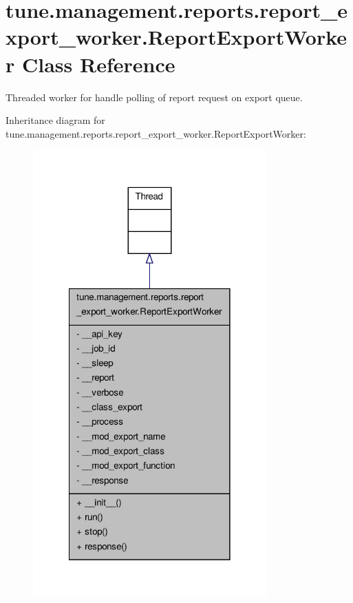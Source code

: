 \hypertarget{classtune_1_1management_1_1reports_1_1report__export__worker_1_1ReportExportWorker}{\section{tune.\-management.\-reports.\-report\-\_\-export\-\_\-worker.\-Report\-Export\-Worker Class Reference}
\label{classtune_1_1management_1_1reports_1_1report__export__worker_1_1ReportExportWorker}
}


Threaded worker for handle polling of report request on export queue.  




Inheritance diagram for tune.\-management.\-reports.\-report\-\_\-export\-\_\-worker.\-Report\-Export\-Worker\-:
\nopagebreak
\begin{figure}[H]
\begin{center}
\leavevmode
\includegraphics[width=254pt]{classtune_1_1management_1_1reports_1_1report__export__worker_1_1ReportExportWorker__inherit__graph}
\end{center}
\end{figure}


